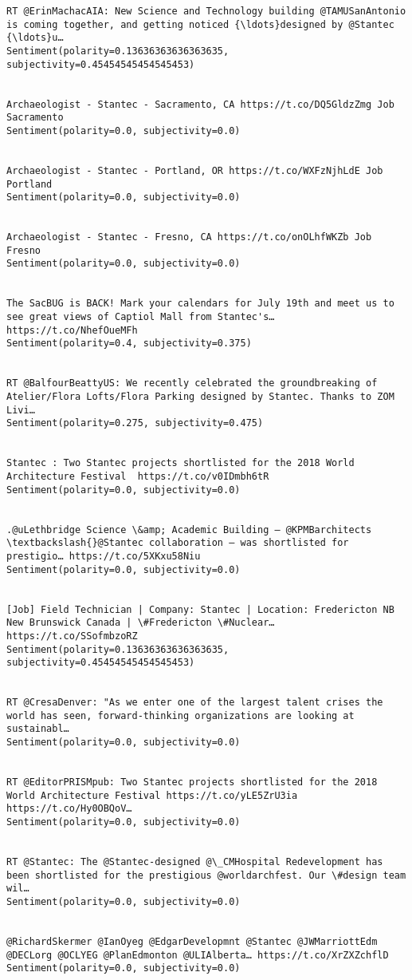 \documentclass[11pt]{article}
\begin{document}
\begin{Verbatim}[commandchars=\\\{\}]
RT @ErinMachacAIA: New Science and Technology building @TAMUSanAntonio is coming together, and getting noticed {\ldots}designed by @Stantec {\ldots}u…
Sentiment(polarity=0.13636363636363635, subjectivity=0.45454545454545453)


Archaeologist - Stantec - Sacramento, CA https://t.co/DQ5GldzZmg Job Sacramento
Sentiment(polarity=0.0, subjectivity=0.0)


Archaeologist - Stantec - Portland, OR https://t.co/WXFzNjhLdE Job Portland
Sentiment(polarity=0.0, subjectivity=0.0)


Archaeologist - Stantec - Fresno, CA https://t.co/onOLhfWKZb Job Fresno
Sentiment(polarity=0.0, subjectivity=0.0)


The SacBUG is BACK! Mark your calendars for July 19th and meet us to see great views of Captiol Mall from Stantec's… https://t.co/NhefOueMFh
Sentiment(polarity=0.4, subjectivity=0.375)


RT @BalfourBeattyUS: We recently celebrated the groundbreaking of Atelier/Flora Lofts/Flora Parking designed by Stantec. Thanks to ZOM Livi…
Sentiment(polarity=0.275, subjectivity=0.475)


Stantec : Two Stantec projects shortlisted for the 2018 World Architecture Festival  https://t.co/v0IDmbh6tR
Sentiment(polarity=0.0, subjectivity=0.0)


.@uLethbridge Science \&amp; Academic Building – @KPMBarchitects \textbackslash{}@Stantec collaboration – was shortlisted for prestigio… https://t.co/5XKxu58Niu
Sentiment(polarity=0.0, subjectivity=0.0)


[Job] Field Technician | Company: Stantec | Location: Fredericton NB New Brunswick Canada | \#Fredericton \#Nuclear… https://t.co/SSofmbzoRZ
Sentiment(polarity=0.13636363636363635, subjectivity=0.45454545454545453)


RT @CresaDenver: "As we enter one of the largest talent crises the world has seen, forward-thinking organizations are looking at sustainabl…
Sentiment(polarity=0.0, subjectivity=0.0)


RT @EditorPRISMpub: Two Stantec projects shortlisted for the 2018 World Architecture Festival https://t.co/yLE5ZrU3ia https://t.co/Hy0OBQoV…
Sentiment(polarity=0.0, subjectivity=0.0)


RT @Stantec: The @Stantec-designed @\_CMHospital Redevelopment has been shortlisted for the prestigious @worldarchfest. Our \#design team wil…
Sentiment(polarity=0.0, subjectivity=0.0)


@RichardSkermer @IanOyeg @EdgarDevelopmnt @Stantec @JWMarriottEdm @DECLorg @OCLYEG @PlanEdmonton @ULIAlberta… https://t.co/XrZXZchflD
Sentiment(polarity=0.0, subjectivity=0.0)



\end{Verbatim}
\end{document}
